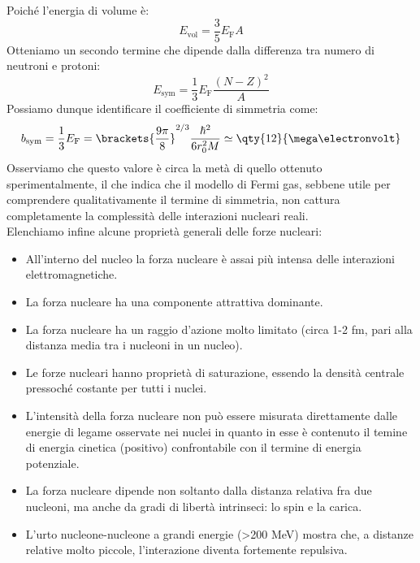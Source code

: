 Poiché l'energia di volume è:
\begin{equation}
    E_{\text{vol}} = \dfrac{3}{5} E_{\text{F}} A
\end{equation}
Otteniamo un secondo termine che dipende dalla differenza tra numero di neutroni e protoni:
\begin{equation}
    E_{\text{sym}} = \dfrac{1}{3} E_{\text{F}} \dfrac{(N-Z)^2}{A}
\end{equation}
Possiamo dunque identificare il coefficiente di simmetria come:
\begin{equation}
    b_{\text{sym}} = \dfrac{1}{3} E_{\text{F}} = \brackets{ \dfrac{9 \pi }{8} }^{2/3} \dfrac{\hbar^2}{6r_0^2 M} \simeq \qty{12}{\mega\electronvolt}
\end{equation}
Osserviamo che questo valore è circa la metà di quello ottenuto sperimentalmente, il che indica che il modello di Fermi gas, sebbene utile per comprendere qualitativamente il termine di simmetria, non cattura completamente la complessità delle interazioni nucleari reali.\\

Elenchiamo infine alcune proprietà generali delle forze nucleari:
\begin{itemize}
  \item All'interno del nucleo la forza nucleare è assai più intensa delle interazioni elettromagnetiche.
  \item La forza nucleare ha una componente attrattiva dominante.
  \item La forza nucleare ha un raggio d'azione molto limitato (circa 1-2 fm, pari alla distanza media tra i nucleoni in un nucleo).
  \item Le forze nucleari hanno proprietà di saturazione, essendo la densità centrale pressoché costante per tutti i nuclei.
  \item L'intensità della forza nucleare non può essere misurata direttamente dalle energie di legame osservate nei nuclei in quanto in esse è contenuto il temine di energia cinetica (positivo) confrontabile con il termine di energia potenziale.
  \item La forza nucleare dipende non soltanto dalla distanza relativa fra due nucleoni, ma anche da gradi di libertà intrinseci: lo spin e la carica.
  \item L'urto nucleone-nucleone a grandi energie (>200 MeV) mostra che, a distanze relative molto piccole, l'interazione diventa fortemente repulsiva.
\end{itemize}

